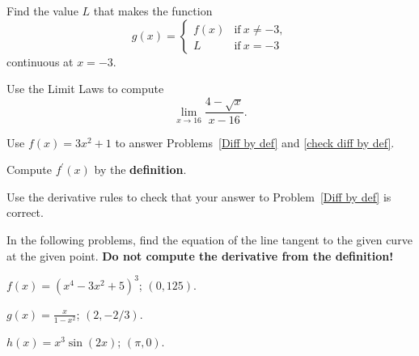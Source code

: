 \documentclass[12pt]{amsart}
\begin{document}
\vspace{2in}

\begin{thm}[3 Points]\label{fix discont}
    Find the value \(L\) that makes the function
    \[g(x) = \left\{\begin{matrix}
    f(x) & \text{if}\ x \neq -3,\\
    L & \text{if}\ x = -3
    \end{matrix}
    \right.\]
    continuous at \(x = -3\).
\end{thm}

\newpage

\begin{thm}[10 Points]
  Use the Limit Laws to compute
  \[\lim_{x \to 16} \frac{4 - \sqrt{x}}{x - 16}.\]
\end{thm}

\vspace{3in}

\noindent Use \(f(x) = 3x^2 + 1\) to answer Problems~\ref{Diff by def} and \ref{check diff by def}.

\begin{thm}[10 Points]\label{Diff by def}
  Compute \(f^\prime(x)\) by the \textbf{definition}.
\end{thm}

\vspace{3in}

\begin{thm}[5 Points]\label{check diff by def}
  Use the derivative rules to check that your answer to Problem~\ref{Diff by def} is correct.
\end{thm}

\newpage

\noindent In the following problems, find the equation of the line tangent to the given curve at the given point.
\textbf{Do not compute the derivative from the definition!}
\begin{thm}[15 Points]
  \(\displaystyle{f(x) = (x^4 - 3x^2 + 5)^3}\); \((0,125)\).
\end{thm}

\vspace{2in}
\begin{thm}[15 Points]
  \(\displaystyle{g(x) = \frac{x}{1 - x^2}}\); \((2,-2/3)\).
\end{thm}

\vspace{2in}

\begin{thm}[15 Points]
  \(\displaystyle{h(x) = x^3\sin(2x)}\); \((\pi,0)\).
\end{thm}
\end{document}
